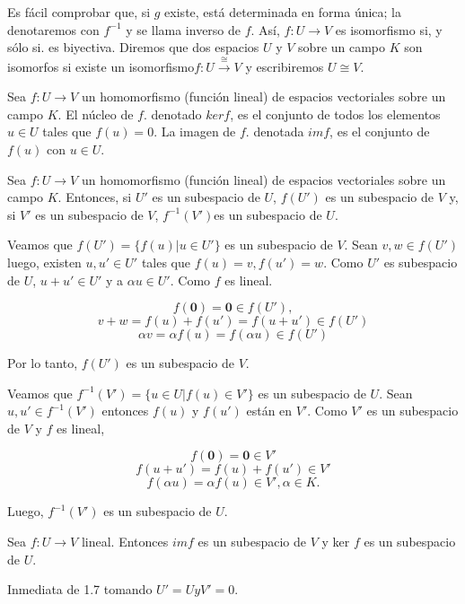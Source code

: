 				Es fácil comprobar que, si $ g $ existe, está determinada en forma única; la denotaremos con $ f^{-1} $ y se llama inverso de $ f $. Así, $ f:U \rightarrow V  $ es isomorfismo si, y sólo si. es biyectiva. Diremos que dos espacios $ U $ y $ V $ sobre un campo $ K $ son isomorfos si existe un isomorfismo$ f:U \overset{\cong}{\rightarrow} V$ y escribiremos $ U \cong V $.
				
				\begin{defi}
					Sea $ f:U \rightarrow V  $ un homomorfismo (función lineal) de espacios vectoriales sobre un campo $ K $. El núcleo de $ f $. denotado $ ker f $, es el conjunto de todos los elementos $ u \in U $ tales que $ f(u) = 0 $. La imagen de $ f $. denotada $ im f $, es el conjunto de $ f(u) $ con $u \in U $.
				\end{defi}
			
				\begin{pro}
					Sea  $ f:U \rightarrow V $ un homomorfismo (función lineal)
					de espacios vectoriales sobre un campo $ K $. Entonces, si $ U' $ es un subespacio de $ U $, $ f(U') $	es un subespacio de $ V $ y, si $ V' $ es un subespacio de $ V $, $ f^{-1}( V') $es un subespacio de $ U $.
				\end{pro}
				\begin{demo}
					Veamos que $ f(U') = \{f(u)|u \in U'\} $ es un subespacio de $ V $. Sean $ v,w \in f(U') $ luego, existen $ u, u' \in U' $ tales que $ f(u) = v, f(u') = w $. Como $ U' $ es subespacio de $ U $, $ u + u' \in  U' $ y a $ \alpha u \in U' $. Como $ f $ es lineal.
					
					\[ f(\mathbf{0}) = \mathbf{0} \in f(U'),\] 
					\[ 	v+w = f(u)+f(u')=f(u+u') \in f(U') \]
					\[ \alpha v = \alpha f(u) = f(\alpha u) \in f(U')\]
				\end{demo}
				Por lo tanto, $ f(U') $ es un subespacio de $ V $.
				
				Veamos que $ f^{-1}(V') = \{u \in U|f(u) \in V'\}$ es un subespacio de $ U $. Sean $ u,u' \in f^{-1}(V')$ entonces $ f(u) $ y $ f(u') $ están en $ V' $. Como $ V' $ es un subespacio de $ V $ y $ f $ es lineal,
				
				\[ f(\mathbf{0}) = \mathbf{0} \in V'\]
				\[ f(u + u') = f(u) + f(u') \in V'\]
				\[ f(\alpha u) = \alpha f(u) \in V', \alpha \in K. \]
				
				Luego,	$ f^{-1}(V') $ es un subespacio de $ U $.
				
				\begin{coro}
					Sea $ f:U \rightarrow V $ lineal. Entonces $ im f $ es un subespacio de $ V $ y ker $ f $ es un subespacio de $ U $.
				\end{coro}
				\begin{demo}
					Inmediata de 1.7 tomando $ U' = U y V' = 0 $.
				\end{demo}
			
